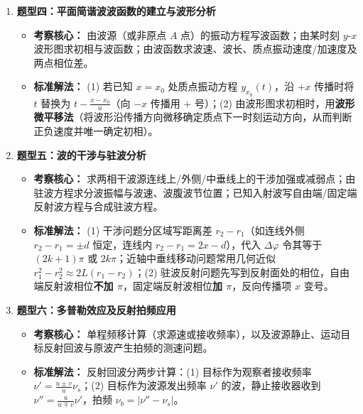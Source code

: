 \documentclass[zihao=5,a4paper,UTF8]{ctexart}
\begin{document}
\begin{typebox}[机械波常见题型分析]
\begin{enumerate}
    \item \textbf{题型四：平面简谐波波函数的建立与波形分析}
    \begin{itemize}
        \item \textbf{考察核心：} 由波源（或非原点 $A$ 点）的振动方程写波函数；由某时刻 $y\text{-}x$ 波形图求初相与波函数；由波函数求波速、波长、质点振动速度/加速度及两点相位差。
        \item \textbf{标准解法：} (1) 若已知 $x=x_0$ 处质点振动方程 $y_{x_0}(t)$，沿 $+x$ 传播时将 $t$ 替换为 $t - \frac{x - x_0}{u}$（向 $-x$ 传播用 $+$ 号）；(2) 由波形图求初相时，用\textbf{波形微平移法}（将波形沿传播方向微移确定质点下一时刻运动方向，从而判断正负速度并唯一确定初相）。
    \end{itemize}
    \item \textbf{题型五：波的干涉与驻波分析}
    \begin{itemize}
        \item \textbf{考察核心：} 求两相干波源连线上/外侧/中垂线上的干涉加强或减弱点；由驻波方程求分波振幅与波速、波腹波节位置；已知入射波写自由端/固定端反射波方程与合成驻波方程。
        \item \textbf{标准解法：} (1) 干涉问题分区域写距离差 $r_2 - r_1$（如连线外侧 $r_2 - r_1 = \pm d$ 恒定，连线内 $r_2 - r_1 = 2x - d$），代入 $\Delta\varphi$ 令其等于 $(2k+1)\pi$ 或 $2k\pi$；近轴中垂线移动问题常用几何近似 $r_1^2 - r_2^2 \approx 2L(r_1 - r_2)$；(2) 驻波反射问题先写到反射面处的相位，自由端反射波相位\textbf{不加 $\pi$}，固定端反射波相位\textbf{加 $\pi$}，反向传播项 $x$ 变号。
    \end{itemize}
    \item \textbf{题型六：多普勒效应及反射拍频应用}
    \begin{itemize}
        \item \textbf{考察核心：} 单程频移计算（求源速或接收频率），以及波源静止、运动目标反射回波与原波产生拍频的测速问题。
        \item \textbf{标准解法：} 反射回波分两步计算：(1) 目标作为观察者接收频率 $\nu' = \frac{u \pm v}{u}\nu_s$；(2) 目标作为波源发出频率 $\nu'$ 的波，静止接收器收到 $\nu'' = \frac{u}{u \mp v}\nu'$，拍频 $\nu_b = |\nu'' - \nu_s|$。
    \end{itemize}
\end{enumerate}
\end{typebox}

\end{document}
